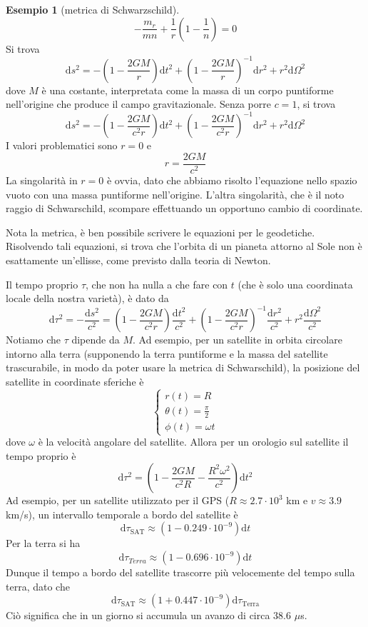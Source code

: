 \documentclass[a4paper,11pt]{article}
\theoremstyle{definition}
\newtheorem{esempio}{Esempio}[section]
\theoremstyle{theorem}
\newcommand{\dif}{\mathrm{d}}
\begin{document}
\begin{esempio}[metrica di Schwarzschild]
	\[-\frac{m_r}{mn}+\frac{1}{r}\left(1-\frac{1}{n}\right)=0\]
	Si trova
	\[\dif s^2=-\left(1-\frac{2GM}{r}\right)\dif t^2+\left(1-\frac{2GM}{r}\right)^{-1}\dif r^2+r^2\dif\Omega^2\]
	dove $M$ è una costante, interpretata come la massa di un corpo puntiforme nell'origine che produce il campo gravitazionale.
	Senza porre $c=1$, si trova
	\[\dif s^2=-\left(1-\frac{2GM}{c^2r}\right)\dif t^2+\left(1-\frac{2GM}{c^2r}\right)^{-1}\dif r^2+r^2\dif\Omega^2\]
	I valori problematici sono $r=0$ e \[r=\frac{2GM}{c^2}\]
	La singolarità in $r=0$ è ovvia, dato che abbiamo risolto l'equazione nello spazio vuoto con una massa puntiforme nell'origine. L'altra singolarità, che è il noto raggio di Schwarschild, scompare effettuando un opportuno cambio di coordinate. 
	
	Nota la metrica, è ben possibile scrivere le equazioni per le geodetiche. Risolvendo tali equazioni, si trova che l'orbita di un pianeta attorno al Sole non è esattamente un'ellisse, come previsto dalla teoria di Newton.
	
	Il tempo proprio $\tau$, che non ha nulla a che fare con $t$ (che è solo una coordinata locale della nostra varietà), è dato da
	\[\dif\tau^2=-\frac{\dif s^2}{c^2}=\left(1-\frac{2GM}{c^2r}\right)\frac{\dif t^2}{c^2}+\left(1-\frac{2GM}{c^2r}\right)^{-1}\frac{\dif r^2}{c^2}+r^2\frac{\dif\Omega^2}{c^2}\]
	Notiamo che $\tau$ dipende da $M$. Ad esempio, per un satellite in orbita circolare intorno alla terra (supponendo la terra puntiforme e la massa del satellite trascurabile, in modo da poter usare la metrica di Schwarschild), la posizione del satellite in coordinate sferiche è 
	\[\left\{\begin{array}{l}
	r(t)=R\\\theta(t)=\frac{\pi}{2}\\\phi(t)=\omega t
	\end{array}\right.\]
	dove $\omega$ è la velocità angolare del satellite. Allora per un orologio sul satellite il tempo proprio è
	\[\dif\tau^2=\left(1-\frac{2GM}{c^2R}-\frac{R^2\omega^2}{c^2}\right)\dif t^2\]
	Ad esempio, per un satellite utilizzato per il GPS ($R\approx 2.7\cdot10^{3}$ km e $v\approx3.9$ km/s), un intervallo temporale a bordo del satellite è
	\[\dif\tau_{\textrm{SAT}}\approx\left(1-0.249\cdot10^{-9}\right)\dif t\]
	Per la terra si ha
	\[\dif\tau_{Terra}\approx(1-0.696\cdot10^{-9})\dif t\]
	Dunque il tempo a bordo del satellite trascorre più velocemente del tempo sulla terra, dato che
	\[\dif\tau_{\textrm{SAT}}\approx\left(1+0.447\cdot10^{-9}\right)\dif\tau_{\textrm{Terra}}\]
	Ciò significa che in un giorno si accumula un avanzo di circa $38.6$ $\mu$s.
\end{esempio}
\end{document}
